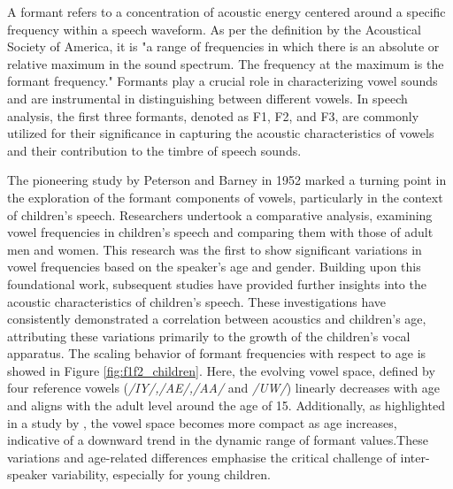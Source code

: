 
A formant refers to a concentration of acoustic energy centered around a specific frequency within a speech waveform. As per the definition by the Acoustical Society of America, it is "a range of frequencies in which there is an absolute or relative maximum in the sound spectrum. The frequency at the maximum is the formant frequency." Formants play a crucial role in characterizing vowel sounds and are instrumental in distinguishing between different vowels. In speech analysis, the first three formants, denoted as F1, F2, and F3, are commonly utilized for their significance in capturing the acoustic characteristics of vowels and their contribution to the timbre of speech sounds.


The pioneering study by Peterson and Barney in 1952 \cite{first_vowel_study} marked a turning point in the exploration of the formant components of vowels, particularly in the context of children's speech. Researchers undertook a comparative analysis, examining vowel frequencies in children's speech and comparing them with those of adult men and women. This research was the first to show significant variations in vowel frequencies based on the speaker's age and gender. Building upon this foundational work, subsequent studies \cite{reviewASRchildren,Acoustic_change_children,why_children_speech_no_working} have provided further insights into the acoustic characteristics of children's speech. These investigations have consistently demonstrated a correlation between acoustics and children's age, attributing these variations primarily to the growth of the children's vocal apparatus. The scaling behavior of formant frequencies with respect to age is showed in Figure \ref{fig:f1f2_children}. Here, the evolving vowel space, defined by four reference vowels (\textit{/IY/,/AE/,/AA/} and \textit{/UW/}) linearly decreases with age and aligns with the adult level around the age of 15. Additionally, as highlighted in a study by \cite{reviewASRchildren}, the vowel space becomes more compact as age increases, indicative of a downward trend in the dynamic range of formant values.These variations and age-related differences emphasise the critical challenge of inter-speaker variability, especially for young children.

